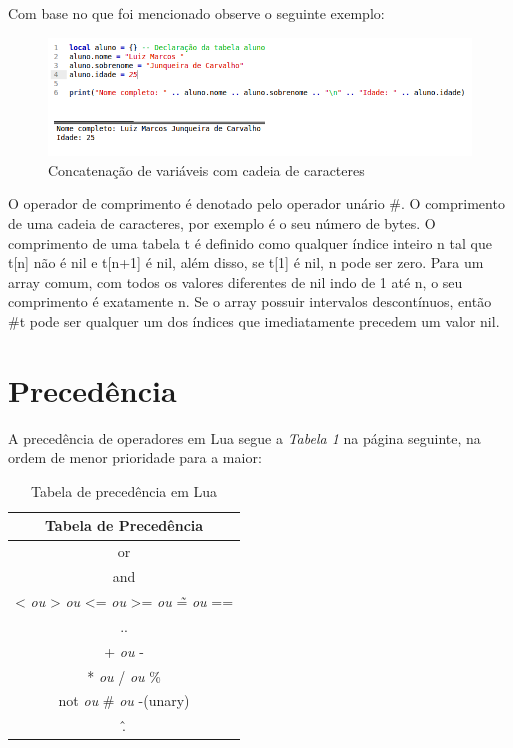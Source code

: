 \documentclass[
12pt, %
openright, %
oneside, %
a4paper, %
english, %
brazil, %
]{abntex2}
\begin{document}
Com base no que foi mencionado observe o seguinte exemplo:

\begin{figure}[H]
\centering
\includegraphics[width=1\linewidth]{imagens/concatenacao.png}
\caption{Concatenação de variáveis com cadeia de caracteres}
\end{figure}

O operador de comprimento é denotado pelo operador unário \#. O comprimento de uma cadeia de caracteres, por exemplo é o seu número de bytes. O comprimento de uma tabela t é definido como qualquer índice inteiro n tal que t[n] não é nil e t[n+1] é nil, além disso, se t[1] é nil, n pode ser zero. Para um array comum, com todos os valores diferentes de nil indo de 1 até n, o seu comprimento é exatamente n. Se o array possuir intervalos descontínuos, então \#t pode ser qualquer um dos índices que imediatamente precedem um valor nil.

\section{Precedência}
A precedência de operadores em Lua segue a \textit{Tabela 1} na página seguinte, na ordem de menor prioridade para a maior:
\begin{table}
\centering
\begin{tabular}{c|c|c|c|c|c}
\hline
\multicolumn{6}{|c|}{\textbf{Tabela de Precedência}} \\
\hline
\multicolumn{6}{|c|}{or} \\
\hline
\multicolumn{6}{|c|}{and} \\
\hline
\multicolumn{6}{|c|}{< \textit{ou} > \textit{ou} <= \textit{ou} >= \textit{ou} \~= \textit{ou} ==} \\
\hline
\multicolumn{6}{|c|}{..} \\
\hline
\multicolumn{6}{|c|}{+ \textit{ou} -} \\
\hline
\multicolumn{6}{|c|}{* \textit{ou} / \textit{ou} \%} \\
\hline
\multicolumn{6}{|c|}{not \textit{ou} \# \textit{ou} -(unary)} \\
\hline
\multicolumn{6}{|c|}{\^.} \\
\end{tabular}
\label{completa}
\caption{Tabela de precedência em Lua}
\end{table}
\end{document}
